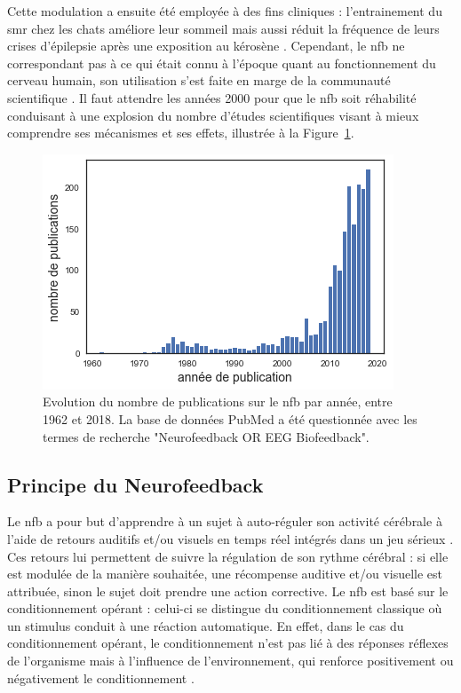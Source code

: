 Cette modulation a ensuite été employée à des fins cliniques : l'entrainement du \gls{smr} chez les chats améliore leur sommeil \citep{Sterman1970} mais aussi
réduit la fréquence de leurs crises d'épilepsie après une exposition au kérosène \citep{Sterman1974}. Cependant, le \gls{nfb} ne correspondant pas à ce qui 
était connu à l'époque quant au fonctionnement du cerveau humain, son utilisation s'est faite en marge de la communauté scientifique \citep{Masterpasqua2003}. 
Il faut attendre les années 2000 pour que le \gls{nfb} soit réhabilité conduisant à une explosion du nombre d'études scientifiques visant à mieux comprendre 
ses mécanismes et ses effets, illustrée à la Figure~\ref{Figure:introduction_number_of_nfb_publications}. 

\begin{figure}[h!]
  \centering
	\includegraphics[width=0.7\linewidth]{figures/chapter-1/introduction-number-of-nfb-publications} 
  \caption{Evolution du nombre de publications sur le \gls{nfb} par année, entre 1962 et 2018. La base de données PubMed a été questionnée avec les 
	termes de recherche "Neurofeedback OR EEG Biofeedback".}
  \label{Figure:introduction_number_of_nfb_publications}
\end{figure}

\subsection{Principe du Neurofeedback}

Le \gls{nfb} a pour but d'apprendre à un sujet à auto-réguler son activité cérébrale à l'aide de retours auditifs et/ou visuels en temps réel
intégrés dans un jeu sérieux \citep{Wang2010}. Ces retours lui permettent de suivre la régulation de son rythme cérébral : si elle est modulée de 
la manière souhaitée, une récompense auditive et/ou visuelle est attribuée, sinon le sujet doit prendre une action corrective. Le \gls{nfb} 
est basé sur le conditionnement opérant \citep{Reynolds1975} : celui-ci se distingue du conditionnement classique où un stimulus conduit à 
une réaction automatique. En effet, dans le cas du conditionnement opérant, le conditionnement n'est pas lié à des réponses réflexes de
l'organisme mais à l'influence de l'environnement, qui renforce positivement ou négativement le conditionnement \citep{Skinner1948}. 

